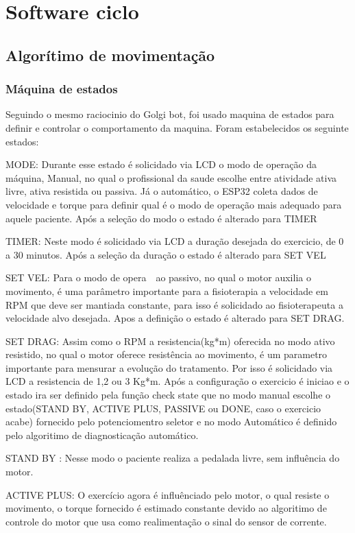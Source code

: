 \documentclass[../poliXuniversity_hospital_(USP)_report.tex]{subfiles}
\begin{document}
\chapter{Software ciclo}

\section{Algorítimo de movimentação}

\subsection{Máquina de estados}
Seguindo o mesmo raciocinio do Golgi bot, foi usado maquina de estados para definir e controlar o comportamento da maquina. Foram estabelecidos os seguinte estados:

MODE: Durante esse estado é solicidado via LCD o modo de operação da máquina, Manual, no qual o profissional da saude escolhe entre atividade ativa livre, ativa resistida ou passiva. Já o automático, o ESP32 coleta dados de velocidade e torque para definir qual é o modo de operação mais adequado para aquele paciente. Após a seleção do modo o estado é alterado para TIMER
  
TIMER: Neste modo é solicidado via LCD a duração desejada do exercicio, de 0 a 30 minutos. Após a seleção da duração o estado é alterado para SET VEL
 
SET VEL: Para o modo de opera~~ao passivo, no qual o motor auxilia o movimento, é uma parâmetro importante para a fisioterapia a velocidade em RPM que deve ser mantiada constante, para isso é solicidado ao fisioterapeuta a velocidade alvo desejada. Apos a definição o estado é alterado para SET DRAG.
 
SET DRAG: Assim como o RPM a resistencia(kg*m) oferecida no modo ativo resistido, no qual o motor oferece resistência ao movimento, é um parametro importante para mensurar a evolução do tratamento. Por isso é solicidado via LCD a resistencia de 1,2 ou 3 Kg*m. Após a configuração o exercicio é iniciao e o estado ira ser definido pela função check state que no modo manual escolhe o estado(STAND BY, ACTIVE PLUS, PASSIVE ou DONE, caso o exercicio acabe) fornecido pelo potenciomentro seletor e no modo Automático é definido pelo algoritimo de diagnosticação automático.
 
STAND BY : Nesse modo o paciente realiza a pedalada livre, sem influência do motor.
 
 ACTIVE PLUS: O exercício agora é influênciado pelo motor, o qual resiste o movimento, o torque fornecido é estimado constante devido ao algoritimo de controle do motor que usa como realimentação o sinal do sensor de corrente.
 
\end{document}
